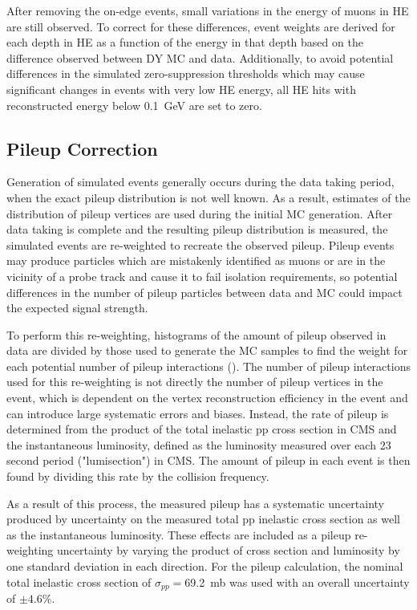 After removing the on-edge events, small variations in the energy of muons in HE are still observed. 
To correct for these differences, event weights are derived for each depth in HE as a function of the energy in that depth based on the difference observed between DY MC and data.
Additionally, to avoid potential differences in the simulated zero-suppression thresholds which may cause significant changes in events with very low HE energy, all HE hits with reconstructed energy below \SI{0.1}{\giga\eV} are set to zero.

\subsection{Pileup Correction}
Generation of simulated events generally occurs during the data taking period, when the exact pileup distribution is not well known.
As a result, estimates of the distribution of pileup vertices are used during the initial MC generation. 
After data taking is complete and the resulting pileup distribution is measured, the simulated events are re-weighted to recreate the observed pileup.
Pileup events may produce particles which are mistakenly identified as muons or are in the vicinity of a probe track and cause it to fail isolation requirements, so potential differences in the number of pileup particles between data and MC could impact the expected signal strength.

To perform this re-weighting, histograms of the amount of pileup observed in data are divided by those used to generate the MC samples to find the weight for each potential number of pileup interactions ().
The number of pileup interactions used for this re-weighting is not directly the number of pileup vertices in the event, which is dependent on the vertex reconstruction efficiency in the event and can introduce large systematic errors and biases.
Instead, the rate of pileup is determined from the product of the total inelastic pp cross section in CMS and the instantaneous luminosity, defined as the luminosity measured over each 23 second period ("lumisection") in CMS.
The amount of pileup in each event is then found by dividing this rate by the collision frequency.

As a result of this process, the measured pileup has a systematic uncertainty produced by uncertainty on the measured total pp inelastic cross section as well as the instantaneous luminosity. 
These effects are included as a pileup re-weighting uncertainty by varying the product of cross section and luminosity by one standard deviation in each direction.
For the pileup calculation, the nominal total inelastic cross section of $\sigma_{pp}=$\SI{69.2}{\milli\barn} was used with an overall uncertainty of $\pm4.6\%$\cite{pileupCx}.

